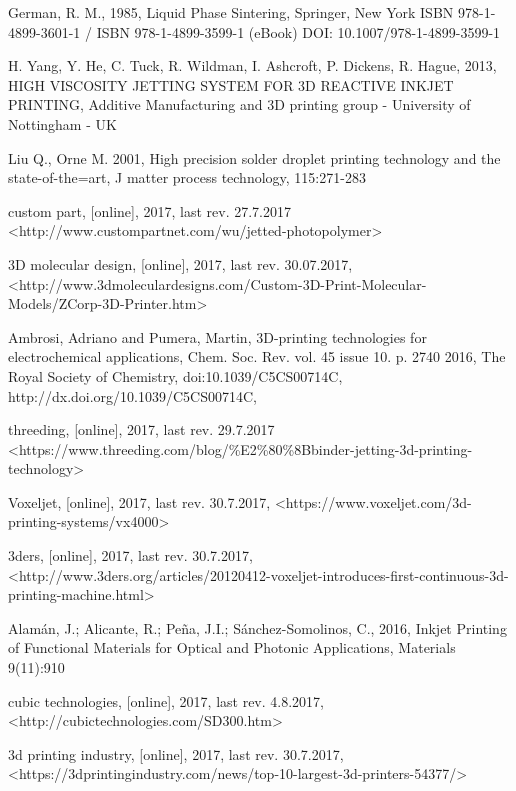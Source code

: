 \documentclass[a4paper, twoside, 11pt]{report}
\begin{document}
\begin{thebibliography}{99}

		
	German, R. M.,
	1985,
	Liquid Phase Sintering,
	Springer,
	New York
	ISBN 978-1-4899-3601-1 / ISBN 978-1-4899-3599-1 (eBook)
	DOI: 10.1007/978-1-4899-3599-1

	H. Yang, Y. He, C. Tuck, R. Wildman, I. Ashcroft, P. Dickens, R. Hague,
	2013,
	HIGH VISCOSITY JETTING SYSTEM FOR 3D REACTIVE INKJET PRINTING,
	Additive Manufacturing and 3D printing group - University of Nottingham - UK 

	Liu Q., Orne M.
	2001,
	High precision solder droplet printing technology and the state-of-the=art,
	J matter process technology,
	115:271-283
	
	custom part,
	[online],
	2017,
	last rev. 27.7.2017
	<http://www.custompartnet.com/wu/jetted-photopolymer>
	
	3D molecular design,
	[online],
	2017,
	last rev. 30.07.2017,
	<http://www.3dmoleculardesigns.com/Custom-3D-Print-Molecular-Models/ZCorp-3D-Printer.htm>

	Ambrosi, Adriano and Pumera, Martin,
	3D-printing technologies for electrochemical applications,
	Chem. Soc. Rev. vol. 45 issue 10. p. 2740
	2016,
	The Royal Society of Chemistry,
	doi:10.1039/C5CS00714C,
	http://dx.doi.org/10.1039/C5CS00714C,

	threeding,
	[online],
	2017,
	last rev. 29.7.2017
	<https://www.threeding.com/blog/\%E2\%80\%8Bbinder-jetting-3d-printing-technology>
	
	Voxeljet,
	[online],
	2017,
	last rev. 30.7.2017,
	<https://www.voxeljet.com/3d-printing-systems/vx4000>
	
	3ders,
	[online],
	2017,
	last rev. 30.7.2017,
	<http://www.3ders.org/articles/20120412-voxeljet-introduces-first-continuous-3d-printing-machine.html>

	Alamán, J.; Alicante, R.; Peña, J.I.; Sánchez-Somolinos, C.,
	2016,
	Inkjet Printing of Functional Materials for Optical and Photonic Applications,
	Materials 9(11):910

	cubic technologies,
	[online],
	2017,
	last rev. 4.8.2017,
	<http://cubictechnologies.com/SD300.htm>
	
	3d printing industry,
	[online],
	2017,
	last rev. 30.7.2017,
	<https://3dprintingindustry.com/news/top-10-largest-3d-printers-54377/>


\end{thebibliography}
\end{document}
